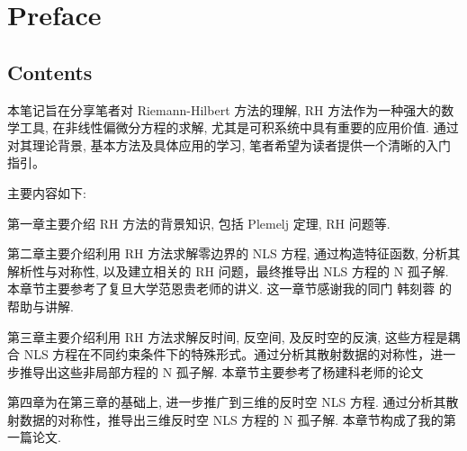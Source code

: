 \chapter{Preface}
\section*{Contents}
本笔记旨在分享笔者对 Riemann-Hilbert 方法的理解, RH 方法作为一种强大的数学工具, 在非线性偏微分方程的求解, 尤其是可积系统中具有重要的应用价值. 通过对其理论背景, 基本方法及具体应用的学习, 笔者希望为读者提供一个清晰的入门指引。

主要内容如下: 

第一章主要介绍 RH 方法的背景知识, 包括 Plemelj 定理, RH 问题等. 

第二章主要介绍利用 RH 方法求解零边界的 NLS 方程, 通过构造特征函数, 分析其解析性与对称性, 以及建立相关的 RH 问题，最终推导出 NLS 方程的 N 孤子解. 本章节主要参考了复旦大学范恩贵老师的讲义\cite{Fan-RH}. 这一章节感谢我的同门 韩刻蓉 的帮助与讲解. 

第三章主要介绍利用 RH 方法求解反时间, 反空间, 及反时空的反演, 这些方程是耦合 NLS 方程在不同约束条件下的特殊形式。通过分析其散射数据的对称性，进一步推导出这些非局部方程的 N 孤子解. 本章节主要参考了杨建科老师的论文\cite{YANG2019328}

第四章为在第三章的基础上, 进一步推广到三维的反时空 NLS 方程. 通过分析其散射数据的对称性，推导出三维反时空 NLS 方程的 N 孤子解. 本章节构成了我的第一篇论文.
%

